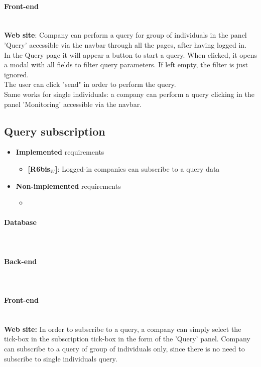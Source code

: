 \paragraph{Front-end} \mbox{}\\
\textbf{Web site}: Company can perform a query for group of individuals in the panel 'Query' accessible via the navbar through all the pages, after having logged in.\\
In the Query page it will appear a button to start a query. When clicked, it opens a modal with all fields to filter query parameters.
If left empty, the filter is just ignored.\\
The user can click "send" in order to perform the query.\\
Same works for single individuals: a company can perform a query clicking in the panel 'Monitoring' accessible via the navbar.

\subsection{Query subscription}
\begin{itemize}
    \item \textbf{Implemented} requirements
        \begin{itemize}
 \item \textbf{[R6bis$_W$]}: Logged-in companies can subscribe to a query data
        \end{itemize}
    \item \textbf{Non-implemented} requirements
    \begin{itemize}
            \item 
        \end{itemize}
\end{itemize}


\paragraph{Database} \mbox{}\\
\paragraph{Back-end} \mbox{}\\


\paragraph{Front-end} \mbox{}\\
\textbf{Web site:} In order to subscribe to a query, a company can simply select the tick-box in the subscription tick-box in the form of the 'Query' panel.
Company can subscribe to a query of group of individuals only, since there is no need to subscribe to single individuals query.

